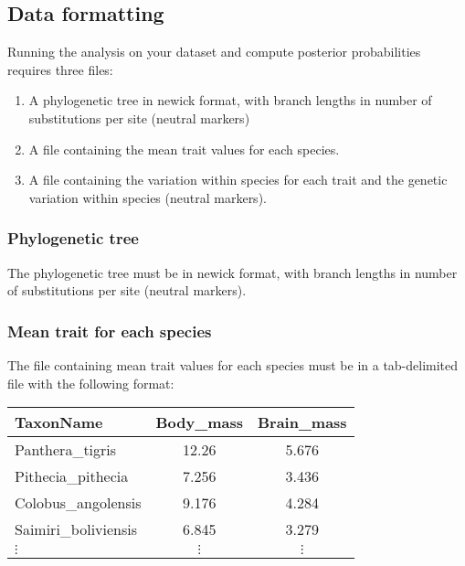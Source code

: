 \documentclass{article}
\begin{document}
\subsection{Data formatting}\label{subsec:data-formatting}

Running the analysis on your dataset and compute posterior probabilities requires three files:
\begin{enumerate}
    \item A phylogenetic tree in newick format, with branch lengths in number of substitutions per site (neutral markers)
    \item A file containing the mean trait values for each species.
    \item A file containing the variation within species for each trait and the genetic variation within species (neutral markers).
\end{enumerate}

\subsubsection{Phylogenetic tree}\label{subsubsec:phylogenetic-tree}

The phylogenetic tree must be in newick format, with branch lengths in number of substitutions per site (neutral markers).

\subsubsection{Mean trait for each species}\label{subsubsec:mean-trait-for-each-species}

The file containing mean trait values for each species must be in a tab-delimited file with the following format:
\begin{center}
    \begin{adjustbox}{width = 0.35\textwidth}
        \begin{tabular}{|l|c|c|}
            \hline
            TaxonName            & Body\_mass & Brain\_mass \\
            \hline
            Panthera\_tigris     & 12.26      & 5.676       \\
            Pithecia\_pithecia   & 7.256      & 3.436       \\
            Colobus\_angolensis  & 9.176      & 4.284       \\
            Saimiri\_boliviensis & 6.845      & 3.279       \\
            $\vdots$             & $\vdots$   & $\vdots$    \\
            \hline
        \end{tabular}\label{tab:trait-mean}
    \end{adjustbox}
\end{center}
\end{document}
